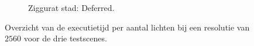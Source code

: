 \begin{figure}[t]
\begin{adjustbox}{minipage=\textwidth, scale=0.6}
\begin{subfigure}[b]{0.83\textwidth}
    \end{subfigure}
  \end{adjustbox} %
  \begin{adjustbox}{minipage=\textwidth, scale=0.6}
    \begin{subfigure}[b]{0.83\textwidth}
      \centering
      \def\svgwidth{\textwidth}
      
      \caption{Ziggurat stad: Deferred.}
      \label{fig:hs-lights-deferred:city}
    \end{subfigure}
  \end{adjustbox}
  \caption{Overzicht van de executietijd per aantal lichten bij een resolutie
           van $2560$ voor de drie testscenes.}
  \label{fig:hs-exec-lights}
\end{figure}

